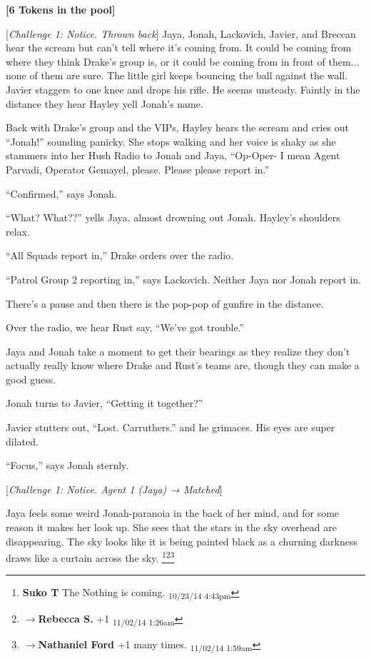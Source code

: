 \noindent\hrulefill





\textbf{{[}6 Tokens in the pool{]}}



{[}\textit{Challenge 1: Notice.  Thrown back}{]} Jaya, Jonah, Lackovich, Javier, and Breccan hear the scream but can't tell where it's coming from.  It could be coming from where they think Drake's group is, or it could be coming from in front of them... none of them are sure.  The little girl keeps bouncing the ball against the wall.  Javier staggers to one knee and drops his rifle.  He seems unsteady.  Faintly in the distance they hear Hayley yell Jonah's name.



Back with Drake's group and the VIPs, Hayley hears the scream and cries out ``Jonah!'' sounding panicky.   She stops walking and her voice is shaky as she stammers into her Hush Radio to Jonah and Jaya, ``Op-Oper- I mean Agent Parvadi, Operator Gemayel, please.  Please please report in.''

``Confirmed,'' says Jonah.

``What?  What??'' yells Jaya, almost drowning out Jonah.  Hayley's shoulders relax.

``All Squads report in,'' Drake orders over the radio.

``Patrol Group 2 reporting in,'' says Lackovich.  Neither Jaya nor Jonah report in.



There's a pause and then there is the pop-pop of gunfire in the distance.

Over the radio, we hear Rust say, ``We've got trouble.''

Jaya and Jonah take a moment to get their bearings as they realize they don't actually really know where Drake and Rust's teams are, though they can make a good guess.

Jonah turns to Javier, ``Getting it together?''

Javier stutters out, ``Lost.  Carruthers.'' and he grimaces.  His eyes are super dilated.

``Focus,'' says Jonah sternly.

{[}\textit{Challenge 1: Notice.  Agent 1 (Jaya) → Matched}{]}

Jaya feels some weird Jonah-paranoia in the back of her mind, and for some reason it makes her look up.  She sees that the stars in the sky overhead are disappearing.  The sky looks like it is being painted black as a churning darkness draws like a curtain across the sky. \footnote{\textbf{Suko T }The Nothing is coming. \textsubscript{10/23/14 4:43pm}}\footnote{$\rightarrow$\textbf{Rebecca S. }+1 \textsubscript{11/02/14 1:26am}}\footnote{$\rightarrow$\textbf{Nathaniel Ford }+1 many times. \textsubscript{11/02/14 1:59am}}

